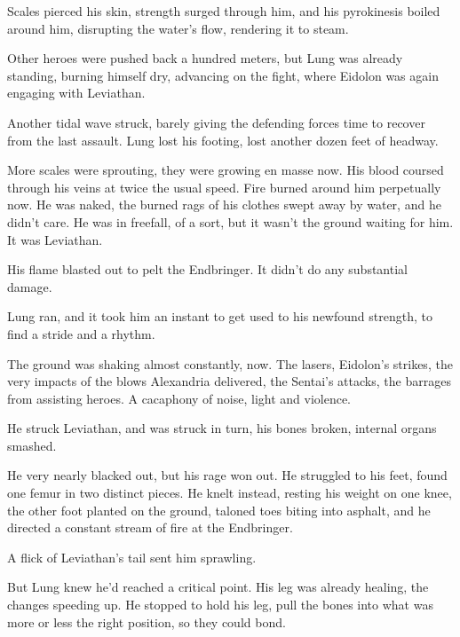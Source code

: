 Scales pierced his skin, strength surged through him, and his pyrokinesis boiled around him, disrupting the water's flow, rendering it to steam.



Other heroes were pushed back a hundred meters, but Lung was already standing, burning himself dry, advancing on the fight, where Eidolon was again engaging with Leviathan.



Another tidal wave struck, barely giving the defending forces time to recover from the last assault.  Lung lost his footing, lost another dozen feet of headway.



More scales were sprouting, they were growing en masse now.  His blood coursed through his veins at twice the usual speed.  Fire burned around him perpetually now.  He was naked, the burned rags of his clothes swept away by water, and he didn't care.  He was in freefall, of a sort, but it wasn't the ground waiting for him.  It was Leviathan.



His flame blasted out to pelt the Endbringer.  It didn't do any substantial damage.



Lung ran, and it took him an instant to get used to his newfound strength, to find a stride and a rhythm.



The ground was shaking almost constantly, now.  The lasers, Eidolon's strikes, the very impacts of the blows Alexandria delivered, the Sentai's attacks, the barrages from assisting heroes.  A cacaphony of noise, light and violence.



He struck Leviathan, and was struck in turn, his bones broken, internal organs smashed.



He very nearly blacked out, but his rage won out.  He struggled to his feet, found one femur in two distinct pieces.  He knelt instead, resting his weight on one knee, the other foot planted on the ground, taloned toes biting into asphalt, and he directed a constant stream of fire at the Endbringer.



A flick of Leviathan's tail sent him sprawling.



But Lung knew he'd reached a critical point.  His leg was already healing, the changes speeding up.  He stopped to hold his leg, pull the bones into what was more or less the right position, so they could bond.



